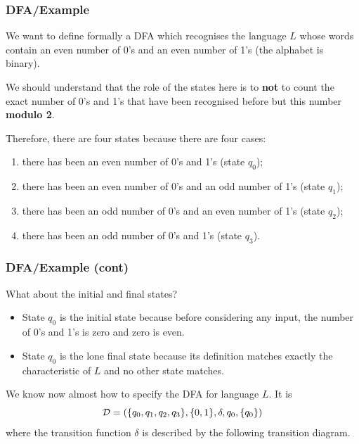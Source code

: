 %
\begin{frame}
\frametitle{DFA/Example}

We want to define formally a DFA which recognises the language \(L\)
whose words contain an even number of 0's and an even number of 1's
(the alphabet is binary).

\bigskip

We should understand that the role of the states here is to
\textbf{not} to count the exact number of 0's and 1's that have been
recognised before but this number \textbf{modulo 2}.

\bigskip

Therefore, there are four states because there are four cases:
\begin{enumerate}

  \item there has been an even number of 0's and 1's (state \(q_0\));

  \item there has been an even number of 0's and an odd number of 1's
    (state \(q_1\));

  \item there has been an odd number of 0's and an even number of 1's
    (state \(q_2\));

  \item there has been an odd number of 0's and 1's (state \(q_3\)).

\end{enumerate}

\end{frame}

%
\begin{frame}
\frametitle{DFA/Example (cont)}

What about the initial and final states?
\begin{itemize}

  \item State \(q_0\) is the initial state because before considering
  any input, the number of 0's and 1's is zero and zero is even.

  \item State \(q_0\) is the lone final state because its definition
  matches exactly the characteristic of \(L\) and no other state
  matches.

\end{itemize}
We know now almost how to specify the DFA for language \(L\). It is
\[
{\cal D} = (\{q_0,q_1,q_2,q_3\}, \{0,1\}, \delta,q_0, \{q_0\})
\]
where the transition function \(\delta\) is described by the following
transition diagram.

\end{frame}

